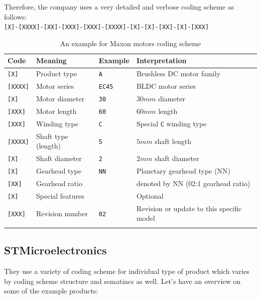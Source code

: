 Therefore, the company uses a very detailed and verbose coding scheme as follows:\\ \texttt{[X]-[XXXX]-[XX]-[XXX]-[XXX]-[XXXX]-[X]-[X]-[XX]-[X]-[XXX]}

\begin{longtable}[]{@{}llll@{}}
    \toprule()
    Code & Meaning & Example & Interpretation \\
    \midrule()
    \endhead
    \texttt{{[}X{]}} & Product type & \texttt{A} & Brushless DC motor
    family \\
    \texttt{{[}XXXX{]}} & Motor series & \texttt{EC45} & BLDC motor
    series \\
    \texttt{{[}X{]}} & Motor diameter & \texttt{30} & \(30mm\) diameter \\
    \texttt{{[}XXX{]}} & Motor length & \texttt{60} & \(60mm\) length \\
    \texttt{{[}XXX{]}} & Winding type & \texttt{C} & Special \texttt{C}
    winding type \\
    \texttt{{[}XXXX{]}} & Shaft type (length) & \texttt{5} & \(5mm\) shaft
    length \\
    \texttt{{[}X{]}} & Shaft diameter & \texttt{2} & \(2mm\) shaft diameter \\
    \texttt{{[}X{]}} & Gearhead type & \texttt{NN} & Planetary gearhead type
    (NN) \\
    \texttt{{[}XX{]}} & Gearhead ratio & & denoted by NN (02:1 gearhead
    ratio) \\
    \texttt{{[}X{]}} & Special features & & Optional \\
    \texttt{{[}XXX{]}} & Revision number & \texttt{02} & Revision or update
    to this specific model \\
    \bottomrule()

    \caption[Maxon motors coding scheme]{An example for Maxon motors coding scheme}
\end{longtable}

\subsection{STMicroelectronics}

They use a variety of coding scheme for individual type of product which varies by coding scheme structure and sematincs as well. Let's have an overview on some of the example products:

